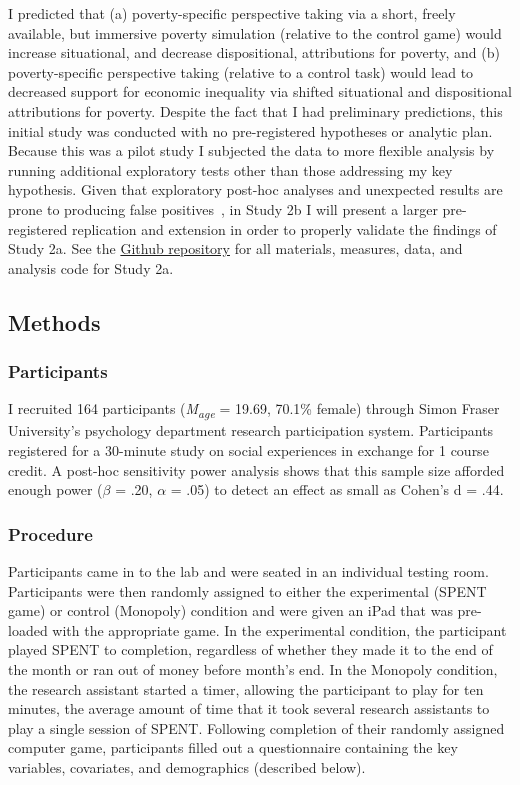 \documentclass{sfuthesis}
\begin{document}
I predicted that (a) poverty-specific perspective taking via a short, freely available, but immersive poverty simulation (relative to the control game) would increase situational, and decrease dispositional, attributions for poverty, and (b) poverty-specific perspective taking (relative to a control task) would lead to decreased support for economic inequality via shifted situational and dispositional attributions for poverty. Despite the fact that I had preliminary predictions, this initial study was conducted with no pre-registered hypotheses or analytic plan. Because this was a pilot study I subjected the data to more flexible analysis by running additional exploratory tests other than those addressing my key hypothesis. Given that exploratory post-hoc analyses and unexpected results are prone to producing false positives~\cite{ioannidis05, simmons11}, in Study 2b I will present a larger pre-registered replication and extension in order to properly validate the findings of Study 2a. See the \href{https://github.com/dwiwad/Dissertation/tree/master/Study\%202a\%20and\%202b}{Github repository} for all materials, measures, data, and analysis code for Study 2a.

\subsection{Methods}

\subsubsection{Participants}
I recruited 164 participants (\textit{M\textsubscript{age}} = 19.69, 70.1\% female) through Simon Fraser University’s psychology department research participation system. Participants registered for a 30-minute study on social experiences in exchange for 1 course credit. A post-hoc sensitivity power analysis shows that this sample size afforded enough power ($\beta$ = .20, $\alpha$ = .05) to detect an effect as small as Cohen’s d = .44. 

\subsubsection{Procedure}
Participants came in to the lab and were seated in an individual testing room. Participants were then randomly assigned to either the experimental (SPENT game) or control (Monopoly) condition and were given an iPad that was pre-loaded with the appropriate game. In the experimental condition, the participant played SPENT to completion, regardless of whether they made it to the end of the month or ran out of money before month’s end. In the Monopoly condition, the research assistant started a timer, allowing the participant to play for ten minutes, the average amount of time that it took several research assistants to play a single session of SPENT. Following completion of their randomly assigned computer game, participants filled out a questionnaire containing the key variables, covariates, and demographics (described below).
\end{document}
